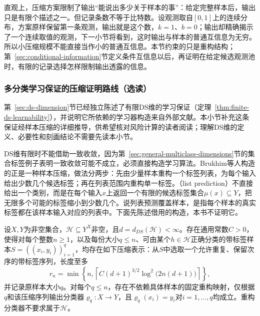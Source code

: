 直观上，压缩方案限制了输出“能说出多少关于样本的事”：给定完整样本后，输出只是有限个描述之一。但记录条数不等于比特数。设观测取自$[0,1]$上的连续分布，方案原样保留第一条观测，输出就是这个数，$k=1$、$b=0$；输出却精确揭示了一个连续取值的观测，下一小节将看到，这时输出与样本的普通互信息为无穷。所以小压缩规模不能直接当作小的普通互信息。本节约束的只是重构结构；第~\ref{sec:conditional-information}节定义条件互信息以后，再证明在给定候选观测池时，有限的记录选择怎样限制输出透露的信息。

\subsubsection{多分类学习保证的压缩证明路线（选读）}
\label{sec:ds-compression-proof}

第~\ref{sec:ds-dimension}节已经独立陈述了有限DS维的学习保证（定理~\ref{thm:finite-ds-learnability}），并说明它所依赖的学习器构造来自外部文献。本小节补充这条保证经样本压缩的详细推导，供希望核对风险计算的读者阅读；理解DS维的定义、必要性和刻画结论不需要先读本小节。

DS维有限时不能借助一致收敛，因为第~\ref{sec:general-multiclass-dimensions}节的集合标签例子表明一致收敛可能不成立，必须直接构造学习算法。Brukhim等人构造的正是一种样本压缩，做法分两步：先由少量样本重构一个标签列表，为每个输入给出少数几个候选标签；再在列表范围内重构单一标签。（list prediction）不直接给出一个类别，而是在每个输入$x$上返回一个有限的候选标签集合$\mu(x)\subseteq Y$，把无限多个可能的标签缩小到少数几个。说列表预测覆盖样本，是指每个样本的真实标签都在该样本输入对应的列表中。下面先陈述借用的构造，本书不证明它。

\begin{lemma}[有限DS维的压缩构造]
\label{lem:finite-ds-compression}
设$X,Y$为非空集合，$\mathcal H\subseteq Y^X$非空，且$d=d_{DS}(\mathcal H)<\infty$。存在通用常数$C>0$，使得对每个整数$n\geq1$，以及每份大小$q\leq n$、可由某个$h\in\mathcal H$正确分类的带标签样本$S=((x_i,y_i))_{i=1}^q$，均存在如下压缩表示：从$S$中选取一个允许重复、保留次序的带标签序列，长度至多
\[
 r_n=\min\!\left\{n,\left\lceil C(d+1)^{3/2}\log^2\!\bigl(2n(d+1)\bigr)\right\rceil\right\},
\]
并记录原样本大小$q$。对每个$q\leq n$，存在不依赖具体样本的固定重构映射，仅根据$q$和该压缩序列输出分类器$\varrho_q:X\to Y$，且$\varrho_q(x_i)=y_i$对$i=1,\ldots,q$均成立。重构分类器不要求属于$\mathcal H$。
\end{lemma}

